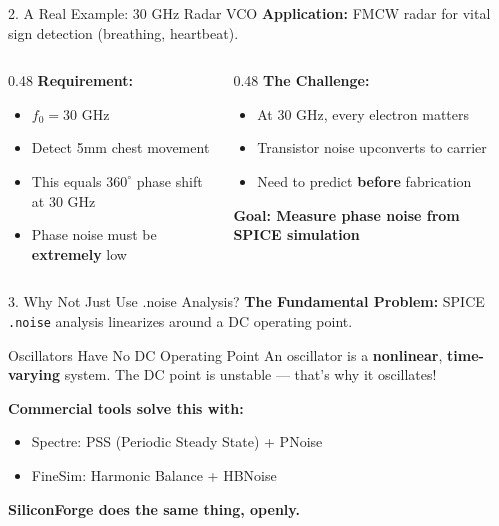 \documentclass[aspectratio=169, 11pt]{beamer}
\begin{document}
\begin{frame}{2. A Real Example: 30 GHz Radar VCO}
    \textbf{Application:} FMCW radar for vital sign detection (breathing, heartbeat).

    \vspace{0.5em}
    \begin{columns}[T]
        \begin{column}{0.48\textwidth}
            \textbf{Requirement:}
            \begin{itemize}
                \item $f_0 = 30$ GHz
                \item Detect 5mm chest movement
                \item This equals $360^\circ$ phase shift at 30 GHz
                \item Phase noise must be \textbf{extremely} low
            \end{itemize}
        \end{column}
        \begin{column}{0.48\textwidth}
            \textbf{The Challenge:}
            \begin{itemize}
                \item At 30 GHz, every electron matters
                \item Transistor noise upconverts to carrier
                \item Need to predict \textbf{before} fabrication
            \end{itemize}
            \vspace{0.5em}
            \textcolor{myred}{\textbf{Goal: Measure phase noise from SPICE simulation}}
        \end{column}
    \end{columns}
\end{frame}

\begin{frame}{3. Why Not Just Use .noise Analysis?}
    \textbf{The Fundamental Problem:}
    SPICE \texttt{.noise} analysis linearizes around a DC operating point.

    \vspace{0.5em}
    \begin{alertblock}{Oscillators Have No DC Operating Point}
        An oscillator is a \textbf{nonlinear}, \textbf{time-varying} system. The DC point is unstable — that's why it oscillates!
    \end{alertblock}

    \vspace{0.5em}
    \textbf{Commercial tools solve this with:}
    \begin{itemize}
        \item Spectre: PSS (Periodic Steady State) + PNoise
        \item FineSim: Harmonic Balance + HBNoise
    \end{itemize}
    \vspace{0.5em}
    \textbf{SiliconForge does the same thing, openly.}
\end{frame}
\end{document}
